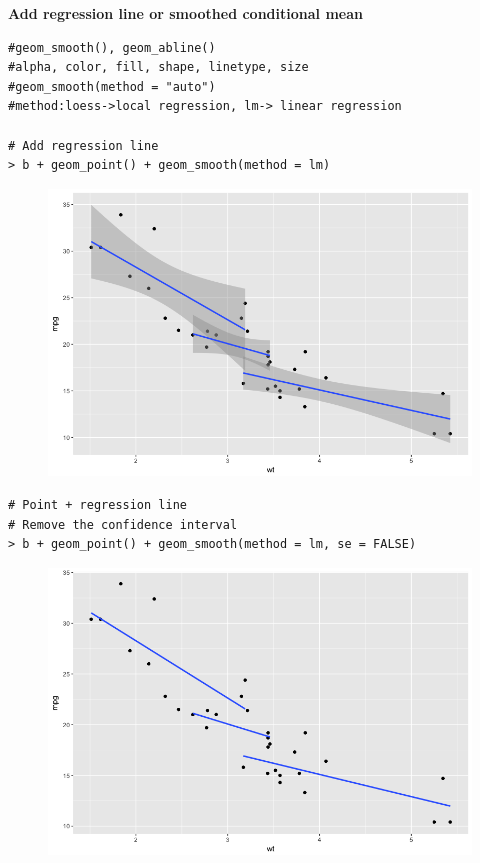 \textbf{Add regression line or smoothed conditional mean}
\begin{lstlisting}[language=html]
#geom_smooth(), geom_abline()
#alpha, color, fill, shape, linetype, size
#geom_smooth(method = "auto")
#method:loess->local regression, lm-> linear regression

# Add regression line
> b + geom_point() + geom_smooth(method = lm)
\end{lstlisting}
\begin{figure}[H]\begin{center}\includegraphics[scale=1 ]{ilu/bg45.png}\end{center}\end{figure}
\begin{lstlisting}[language=html]
# Point + regression line
# Remove the confidence interval
> b + geom_point() + geom_smooth(method = lm, se = FALSE)
\end{lstlisting}
\begin{figure}[H]\begin{center}\includegraphics[scale=1 ]{ilu/bg46.png}\end{center}\end{figure}

